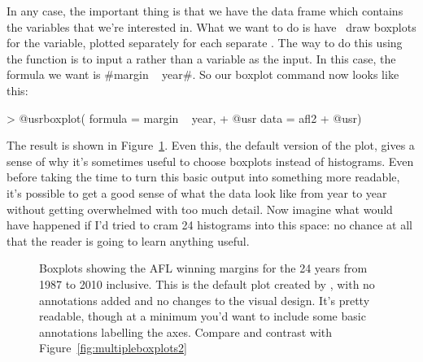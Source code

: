 In any case, the important thing is that we have the  data frame which contains the variables that we're interested in. What we want to do is have \R\ draw boxplots for the  variable, plotted separately for each separate . The way to do this using the  function is to input a  rather than a variable as the input. In this case, the formula we want is \rtextverb#margin ~ year#. So our boxplot command now looks like this:
\begin{rblock1}
> @usr{boxplot( formula = margin ~ year,}
+ @usr{         data = afl2}
+ @usr{)}
\end{rblock1}
The result is shown in Figure~\ref{fig:multipleboxplots}. Even this, the default version of the plot, gives a sense of why it's sometimes useful to choose boxplots instead of histograms. Even before taking the time to turn this basic output into something more readable, it's possible to get a good sense of what the data look like from year to year without getting overwhelmed with too much detail. Now imagine what would have happened if I'd tried to cram 24 histograms into this space: no chance at all that the reader is going to learn anything useful.

\begin{figure}[t]
\begin{center}
\caption{Boxplots showing the AFL winning margins for the 24 years from 1987 to 2010 inclusive. This is the default plot created by \R, with no annotations added and no changes to the visual design. It's pretty readable, though at a minimum you'd want to include some basic annotations labelling the axes. Compare and contrast with Figure~\ref{fig:multipleboxplots2}}
\HR
\label{fig:multipleboxplots}
\end{center}
\end{figure}

